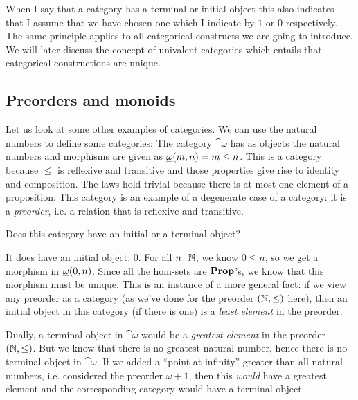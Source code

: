 When I say that a category has a terminal or initial object this also indicates that I assume that we have chosen one which I indicate by $1$ or $0$ respectively. The same principle applies to all categorical constructs we are going to introduce. We will later discuss the concept of univalent categories which entails that categorical constructions are unique.

\subsection{Preorders and monoids}
\label{sec:preorders-mnoids}

Let us look at some other examples of categories. We can use the natural numbers to define some categories: The category $\cat{\omega}$ has as objects the natural numbers and morphisms are given as $\underline{\mathbf{\omega}}(m,n) = m \leq n$. This is a category because $\leq$ is reflexive and transitive and those properties give rise to identity and composition. The laws hold trivial because there is at most one element of a proposition. This category is an example of a degenerate case of a category: it is a \emph{preorder}, i.e. a relation that is reflexive and transitive. 

\begin{Exercise}
  Does this category have an initial or a terminal object? 
\end{Exercise}
\begin{Answer}
  It does have an initial object: 0. For all $n\colon\mathbb{N}$, we know $0\leq n$, so we get a morphism in $\underline{\mathbf{\omega}}(0,n)$. Since all the hom-sets are $\mathbf{Prop}$'s, we know that this morphism must be unique. This is an instance of a more general fact: if we view any preorder as a category (as we've done for the preorder $(\mathbb{N},\leq)$ here), then an initial object in this category (if there is one) is a \emph{least element} in the preorder.

  Dually, a terminal object in $\cat{\omega}$ would be a \emph{greatest element} in the preorder $(\mathbb{N},\leq)$. But we know that there is no greatest natural number, hence there is no terminal object in $\cat{\omega}$. If we added a ``point at infinity'' greater than all natural numbers, i.e. considered the preorder $\omega+1$, then this \emph{would} have a greatest element and the corresponding category would have a terminal object. 
\end{Answer}



